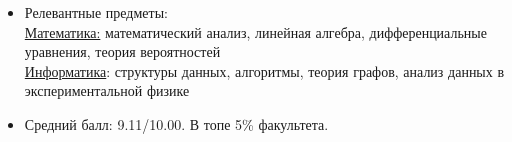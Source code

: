 \begin{itemize}
\item Релевантные предметы: \\
	\underline{Математика:} математический анализ, линейная алгебра, дифференциальные уравнения, теория вероятностей\\
	\underline{Информатика}: структуры данных, алгоритмы, теория графов, анализ данных в экспериментальной физике  \\
\item Средний балл: 9.11/10.00. В топе 5\% факультета.
\end{itemize}
